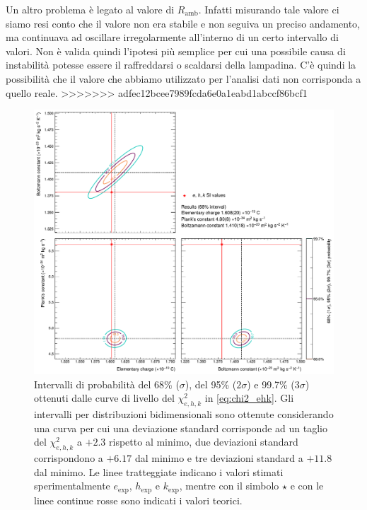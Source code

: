 \documentclass[a4paper, varvw, nofootinbib]{revtex4-2}
\begin{document}
Un altro problema è legato al valore di $R_\text{amb}$. Infatti misurando tale valore ci siamo resi conto che il valore non era stabile e non seguiva un preciso andamento, ma continuava ad oscillare irregolarmente all'interno di un certo intervallo di valori. Non è valida quindi l'ipotesi più semplice per cui una possibile causa di instabilità potesse essere il raffreddarsi o scaldarsi della lampadina. C'è quindi la possibilità che il valore che abbiamo utilizzato per l'analisi dati non corrisponda a quello reale. 
>>>>>>> adfec12bcee7989fcda6e0a1eabd1abccf86bcf1

\begin{figure}
\centering
\includegraphics[width=15cm]{fig/ehk_contour_plot_68}
\caption{Intervalli di probabilità del 68\% ($\sigma$), del 95\% ($2\sigma$) e 99.7\% ($3\sigma$) ottenuti dalle curve di livello del $\chi^2_{e,h,k}$ in \eqref{eq:chi2_ehk}. Gli intervalli per distribuzioni bidimensionali sono ottenute considerando una curva per cui una deviazione standard corrisponde ad un taglio del $\chi^2_{e,h,k}$ a $+2.3$ rispetto al minimo, due deviazioni standard corrispondono a $+6.17$ dal minimo e tre deviazioni standard a $+11.8$ dal minimo. Le linee tratteggiate indicano i valori stimati sperimentalmente $e_\text{exp}$, $h_\text{exp}$ e $k_\text{exp}$, mentre con il simbolo $\star$ e con le linee continue rosse sono indicati i valori teorici.}\label{fig:3}
\end{figure}




\end{document}
